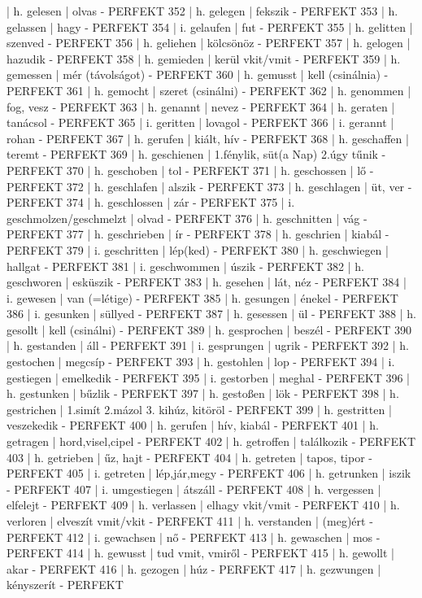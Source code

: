 \documentclass{article}
\newenvironment{exmp}{\verbatim}{\endverbatim}
\begin{document}
\begin{exmp}
351 | h. gelesen | olvas - PERFEKT
352 | h. gelegen | fekszik - PERFEKT
353 | h. gelassen | hagy - PERFEKT
354 | i. gelaufen | fut - PERFEKT
355 | h. gelitten | szenved - PERFEKT
356 | h. geliehen | kölcsönöz - PERFEKT
357 | h. gelogen | hazudik - PERFEKT
358 | h. gemieden | kerül vkit/vmit - PERFEKT
359 | h. gemessen | mér (távolságot) - PERFEKT
360 | h. gemusst | kell (csinálnia) - PERFEKT
361 | h. gemocht | szeret (csinálni) - PERFEKT
362 | h. genommen | fog, vesz - PERFEKT
363 | h. genannt | nevez - PERFEKT
364 | h. geraten | tanácsol - PERFEKT
365 | i. geritten | lovagol - PERFEKT
366 | i. gerannt | rohan - PERFEKT
367 | h. gerufen | kiált, hív - PERFEKT
368 | h. geschaffen | teremt - PERFEKT
369 | h. geschienen | 1.fénylik, süt(a Nap) 2.úgy tűnik - PERFEKT
370 | h. geschoben | tol - PERFEKT
371 | h. geschossen | lő - PERFEKT
372 | h. geschlafen | alszik - PERFEKT
373 | h. geschlagen | üt, ver - PERFEKT
374 | h. geschlossen | zár - PERFEKT
375 | i. geschmolzen/geschmelzt | olvad - PERFEKT
376 | h. geschnitten | vág - PERFEKT
377 | h. geschrieben | ír - PERFEKT
378 | h. geschrien | kiabál - PERFEKT
379 | i. geschritten | lép(ked) - PERFEKT
380 | h. geschwiegen | hallgat - PERFEKT
381 | i. geschwommen | úszik - PERFEKT
382 | h. geschworen | esküszik - PERFEKT
383 | h. gesehen | lát, néz - PERFEKT
384 | i. gewesen | van (=létige) - PERFEKT
385 | h. gesungen | énekel - PERFEKT
386 | i. gesunken | süllyed - PERFEKT
387 | h. gesessen | ül - PERFEKT
388 | h. gesollt | kell (csinálni) - PERFEKT
389 | h. gesprochen | beszél - PERFEKT
390 | h. gestanden | áll - PERFEKT
391 | i. gesprungen | ugrik - PERFEKT
392 | h. gestochen | megcsíp - PERFEKT
393 | h. gestohlen | lop - PERFEKT
394 | i. gestiegen | emelkedik - PERFEKT
395 | i. gestorben | meghal - PERFEKT
396 | h. gestunken | bűzlik - PERFEKT
397 | h. gestoßen | lök - PERFEKT
398 | h. gestrichen | 1.simít 2.mázol 3. kihúz, kitöröl - PERFEKT
399 | h. gestritten | veszekedik - PERFEKT
400 | h. gerufen | hív, kiabál - PERFEKT
401 | h. getragen | hord,visel,cipel - PERFEKT
402 | h. getroffen | találkozik - PERFEKT
403 | h. getrieben | űz, hajt - PERFEKT
404 | h. getreten | tapos, tipor - PERFEKT
405 | i.  getreten | lép,jár,megy - PERFEKT
406 | h. getrunken | iszik - PERFEKT
407 | i. umgestiegen | átszáll - PERFEKT
408 | h. vergessen | elfelejt - PERFEKT
409 | h. verlassen | elhagy vkit/vmit - PERFEKT
410 | h. verloren | elveszít vmit/vkit - PERFEKT
411 | h. verstanden | (meg)ért - PERFEKT
412 | i. gewachsen | nő - PERFEKT
413 | h. gewaschen | mos - PERFEKT
414 | h. gewusst | tud vmit, vmiről - PERFEKT
415 | h. gewollt | akar - PERFEKT
416 | h. gezogen | húz - PERFEKT
417 | h. gezwungen | kényszerít - PERFEKT
\end{exmp}
\end{document}
